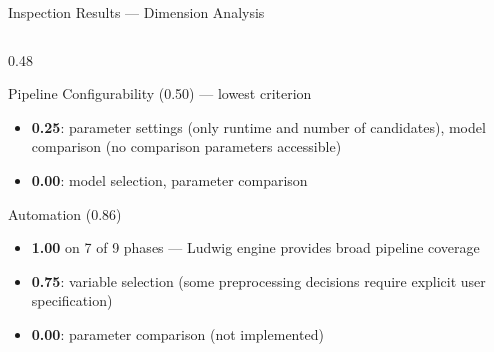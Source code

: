\documentclass[aspectratio=169,10pt,english,dvipsnames]{beamer}
\begin{document}
\begin{frame}{Inspection Results --- Dimension Analysis}
\begin{columns}[T]
\begin{column}{0.48\textwidth}
\begin{block}{Pipeline Configurability (0.50) --- lowest criterion}
\begin{itemize}
          \item \textbf{0.25}: parameter settings (only runtime and
                number of candidates), model comparison (no comparison
                parameters accessible)
          \item \textbf{0.00}: model selection, parameter comparison
        \end{itemize}
      \end{block}
      \vspace{2mm}
      \begin{block}{Automation (0.86)}
        \begin{itemize}\scriptsize
          \item \textbf{1.00} on 7 of 9 phases --- Ludwig engine provides
                broad pipeline coverage
          \item \textbf{0.75}: variable selection (some preprocessing
                decisions require explicit user specification)
          \item \textbf{0.00}: parameter comparison (not implemented)
        \end{itemize}
      \end{block}
    \end{column}
  \end{columns}
\end{frame}
\fi
\end{document}
